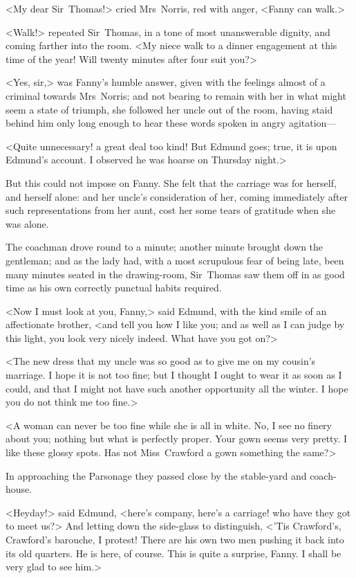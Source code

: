 <My dear Sir~Thomas!> cried Mrs~Norris, red with anger, <Fanny can walk.>

<Walk!> repeated Sir~Thomas, in a tone of most unanswerable dignity, and coming farther into the room. <My niece walk to a dinner engagement at this time of the year! Will twenty minutes after four suit you?>

<Yes, sir,> was Fanny's humble answer, given with the feelings almost of a criminal towards Mrs~Norris; and not bearing to remain with her in what might seem a state of triumph, she followed her uncle out of the room, having staid behind him only long enough to hear these words spoken in angry agitation—

<Quite unnecessary! a great deal too kind! But Edmund goes; true, it is upon Edmund's account. I observed he was hoarse on Thursday night.>

But this could not impose on Fanny. She felt that the carriage was for herself, and herself alone: and her uncle's consideration of her, coming immediately after such representations from her aunt, cost her some tears of gratitude when she was alone.

The coachman drove round to a minute; another minute brought down the gentleman; and as the lady had, with a most scrupulous fear of being late, been many minutes seated in the drawing-room, Sir~Thomas saw them off in as good time as his own correctly punctual habits required.

<Now I must look at you, Fanny,> said Edmund, with the kind smile of an affectionate brother, <and tell you how I like you; and as well as I can judge by this light, you look very nicely indeed. What have you got on?>

<The new dress that my uncle was so good as to give me on my cousin's marriage. I hope it is not too fine; but I thought I ought to wear it as soon as I could, and that I might not have such another opportunity all the winter. I hope you do not think me too fine.>

<A woman can never be too fine while she is all in white. No, I see no finery about you; nothing but what is perfectly proper. Your gown seems very pretty. I like these glossy spots. Has not Miss~Crawford a gown something the same?>

In approaching the Parsonage they passed close by the stable-yard and coach-house.

<Heyday!> said Edmund, <here's company, here's a carriage! who have they got to meet us?> And letting down the side-glass to distinguish, <'Tis Crawford's, Crawford's barouche, I protest! There are his own two men pushing it back into its old quarters. He is here, of course. This is quite a surprise, Fanny. I shall be very glad to see him.>

